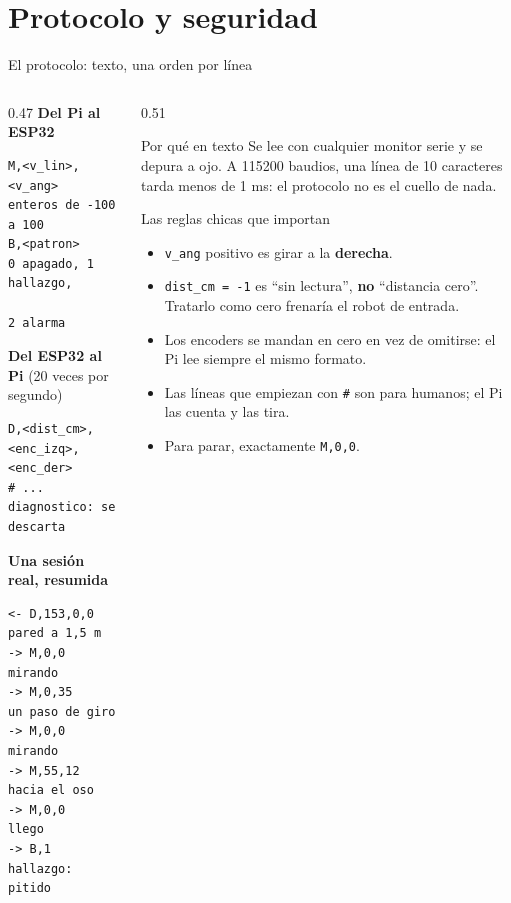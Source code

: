 \section{Protocolo y seguridad}

\begin{frame}[fragile]{El protocolo: texto, una orden por línea}
\begin{columns}[T,onlytextwidth]
\begin{column}{0.47\textwidth}
\footnotesize
\textbf{Del Pi al ESP32}
\begin{verbatim}
M,<v_lin>,<v_ang>    enteros de -100 a 100
B,<patron>           0 apagado, 1 hallazgo,
                     2 alarma
\end{verbatim}
\textbf{Del ESP32 al Pi} (20 veces por segundo)
\begin{verbatim}
D,<dist_cm>,<enc_izq>,<enc_der>
# ...                diagnostico: se descarta
\end{verbatim}
\textbf{Una sesión real, resumida}
\begin{verbatim}
<- D,153,0,0         pared a 1,5 m
-> M,0,0             mirando
-> M,0,35            un paso de giro
-> M,0,0             mirando
-> M,55,12           hacia el oso
-> M,0,0             llego
-> B,1               hallazgo: pitido
\end{verbatim}
\end{column}
\begin{column}{0.51\textwidth}
\footnotesize
\begin{block}{Por qué en texto}
  Se lee con cualquier monitor serie y se depura a ojo. A 115200 baudios, una
  línea de 10 caracteres tarda menos de 1 ms: el protocolo no es el cuello de
  nada.
\end{block}
\begin{block}{Las reglas chicas que importan}
  \begin{itemize}
    \item \verb|v_ang| positivo es girar a la \textbf{derecha}.
    \item \verb|dist_cm = -1| es ``sin lectura'', \textbf{no} ``distancia
          cero''. Tratarlo como cero frenaría el robot de entrada.
    \item Los encoders se mandan en cero en vez de omitirse: el Pi lee siempre
          el mismo formato.
    \item Las líneas que empiezan con \verb|#| son para humanos; el Pi las
          cuenta y las tira.
    \item Para parar, exactamente \verb|M,0,0|.
  \end{itemize}
\end{block}
\end{column}
\end{columns}
\end{frame}

